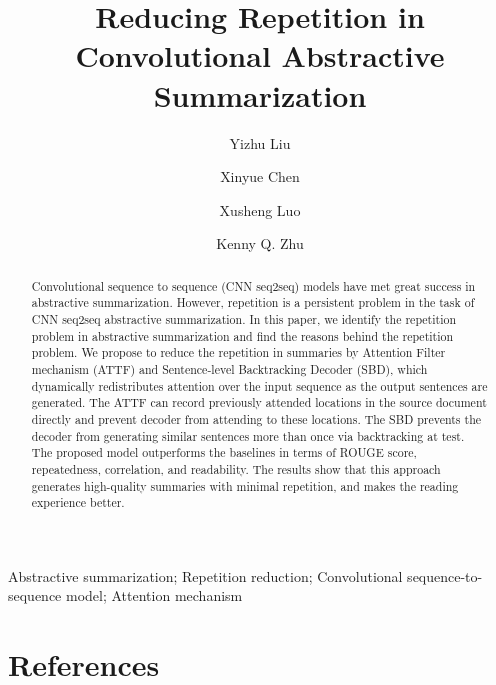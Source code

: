 \documentclass[review]{elsarticle}
\theoremstyle{definition}
\begin{document}
\begin{frontmatter}

\title{Reducing Repetition in Convolutional Abstractive Summarization}

\author[mymainaddress]{Yizhu Liu}
\author[mymainaddress]{Xinyue Chen} 
\author[mysecondaryaddress]{Xusheng Luo} 
\author[mymainaddress]{Kenny Q. Zhu}
\address[mymainaddress]{Department of Computer Science and Engineering, Shanghai Jiao Tong University, Shanghai, China}
\address[mysecondaryaddress]{Search and Recommendation Team, Alibaba Group,
Hangzhou, China}

\begin{abstract}
Convolutional sequence to sequence (CNN seq2seq) models
have met great success in abstractive summarization. 
However, repetition is a persistent problem in the task of 
CNN seq2seq abstractive summarization. 
In this paper, we identify the repetition problem in abstractive summarization and find the reasons behind the repetition problem.
We propose to reduce the repetition in summaries by 
Attention Filter mechanism (ATTF) and Sentence-level Backtracking Decoder (SBD),
which dynamically redistributes attention over the input sequence as the output sentences are generated. 
The ATTF can record previously attended locations in the source document directly and prevent decoder from attending to these locations. The SBD prevents the decoder from generating similar sentences more than once via backtracking at test.
The proposed model outperforms the baselines 
in terms of ROUGE score, repeatedness, correlation, and readability. 
The results show that this approach 
generates high-quality summaries with minimal repetition,
and makes the reading experience better.
\end{abstract}

\begin{keyword}
Abstractive summarization;
Repetition reduction;
Convolutional sequence-to-sequence model; Attention mechanism 
\end{keyword}

\end{frontmatter}
\linenumbers






\section*{References}


\end{document}
